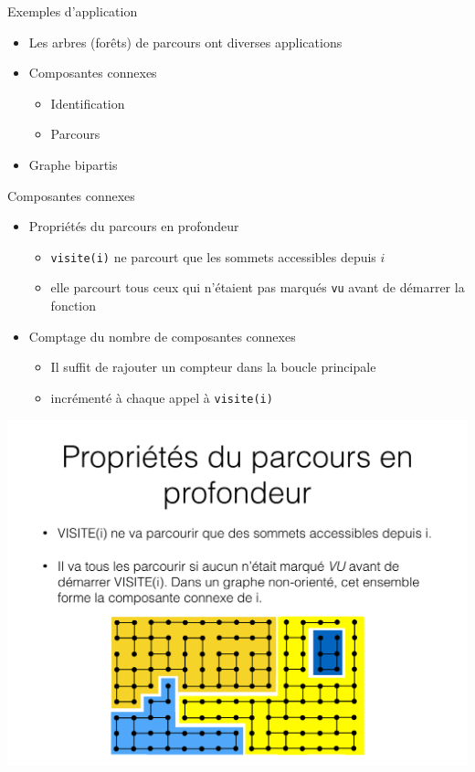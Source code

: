 \begin{frame}{Exemples d'application}
    \begin{itemize}
        \item Les arbres (forêts) de parcours ont diverses applications
        \item Composantes connexes 
        \begin{itemize}
            \item Identification
            \item Parcours 
        \end{itemize}
        \item Graphe bipartis
    \end{itemize}
\end{frame}


\begin{frame}{Composantes connexes}
    \begin{itemize}
        \item Propriétés du parcours en profondeur
        \begin{itemize}
            \item \texttt{visite(i)} ne parcourt que les sommets accessibles depuis $i$ 
            \item elle parcourt tous ceux qui n'étaient pas marqués \texttt{vu} avant de démarrer la fonction 
        \end{itemize}
        \item Comptage du nombre de composantes connexes 
        \begin{itemize}
            \item Il suffit de rajouter un compteur dans la boucle principale 
            \item incrémenté à chaque appel à \texttt{visite(i)}
        \end{itemize}
    \end{itemize}
    \begin{center}
        \includegraphics[width=.5\textwidth]{fig/cc.pdf}
    \end{center}
\end{frame}

